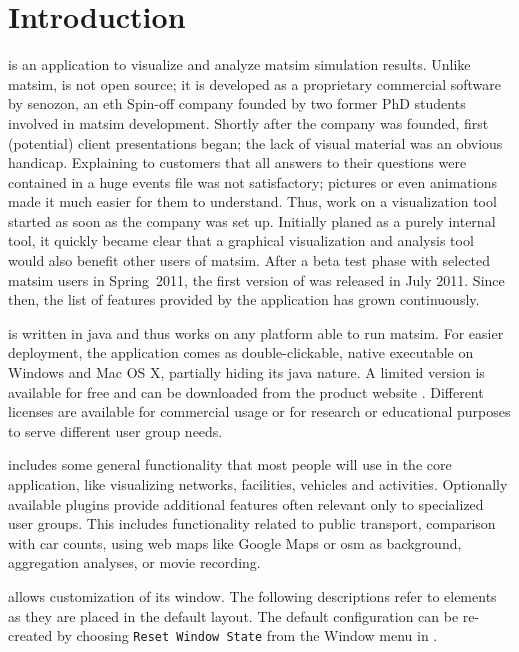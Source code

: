 \section{Introduction}
\Via{} is an application to visualize and analyze \gls{matsim} simulation results.
Unlike \gls{matsim}, \Via{} is not open source; it is developed as a proprietary commercial software
by \gls{senozon}, an \gls{eth} Spin-off company founded by two former PhD students
involved in \gls{matsim} development. Shortly after the company was founded, 
first (potential) client presentations began; the lack of visual material
was an obvious handicap. Explaining to customers that all answers to their questions were
contained in a huge events file was not satisfactory; pictures or
even animations made it much easier for them to understand. Thus,
 work on a visualization tool started as soon as the company
was set up. Initially planed as a purely internal tool, it quickly became clear
that a graphical visualization and analysis tool would also benefit 
other users of \gls{matsim}. After a beta test phase with selected \gls{matsim}
users in Spring~2011, the first version of \Via{} was released in July
2011. Since then, the list of features provided by the application has grown
continuously.

\Via{} is written in \gls{java} and thus works on any platform able to run
\gls{matsim}. For easier deployment, the application comes as double-clickable, native
executable on Windows and Mac OS X, partially hiding its \gls{java} nature. A
limited version is available for free and can be downloaded from the product
website \citep[][]{senozonVIA_Webpage_2015}. 
Different licenses are available for commercial usage or for research or educational purposes
 to serve  different user group needs.

\Via{} includes some general functionality that most people will use in the core
application, like visualizing networks, facilities, vehicles and activities.
Optionally available plugins provide additional features 
often relevant only to specialized user groups. This includes functionality related
to public transport, comparison with car counts, using web maps like Google Maps
or \gls{osm} as background, aggregation analyses, or movie recording.

\Via{} allows customization of its window. The following descriptions refer to
elements as they are placed in the default layout. The default configuration can
be re-created by choosing \lstinline|Reset Window State| from the Window menu in \Via{}.

